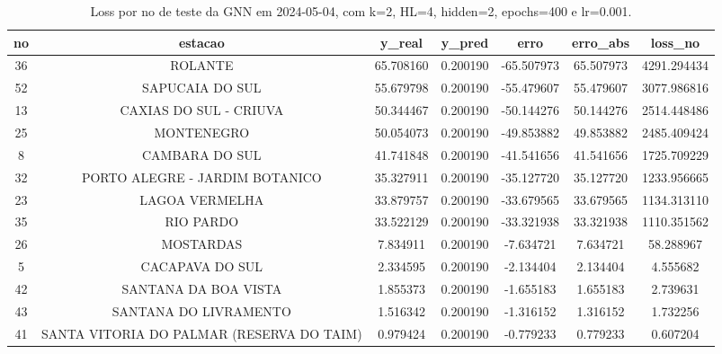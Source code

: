 \begin{table}[h]
\centering
\caption{Loss por no de teste da GNN em 2024-05-04, com k=2, HL=4, hidden=2, epochs=400 e lr=0.001.}
\label{tab:gnn_loss_k2_hl4_h2_e400_d20240504}
\begin{tabular}{ccccccc}
\toprule
no & estacao & y\_real & y\_pred & erro & erro\_abs & loss\_no \\
\midrule
36 & ROLANTE & 65.708160 & 0.200190 & -65.507973 & 65.507973 & 4291.294434 \\
52 & SAPUCAIA DO SUL & 55.679798 & 0.200190 & -55.479607 & 55.479607 & 3077.986816 \\
13 & CAXIAS DO SUL - CRIUVA & 50.344467 & 0.200190 & -50.144276 & 50.144276 & 2514.448486 \\
25 & MONTENEGRO & 50.054073 & 0.200190 & -49.853882 & 49.853882 & 2485.409424 \\
8 & CAMBARA DO SUL & 41.741848 & 0.200190 & -41.541656 & 41.541656 & 1725.709229 \\
32 & PORTO ALEGRE - JARDIM BOTANICO & 35.327911 & 0.200190 & -35.127720 & 35.127720 & 1233.956665 \\
23 & LAGOA VERMELHA & 33.879757 & 0.200190 & -33.679565 & 33.679565 & 1134.313110 \\
35 & RIO PARDO & 33.522129 & 0.200190 & -33.321938 & 33.321938 & 1110.351562 \\
26 & MOSTARDAS & 7.834911 & 0.200190 & -7.634721 & 7.634721 & 58.288967 \\
5 & CACAPAVA DO SUL & 2.334595 & 0.200190 & -2.134404 & 2.134404 & 4.555682 \\
42 & SANTANA DA BOA VISTA & 1.855373 & 0.200190 & -1.655183 & 1.655183 & 2.739631 \\
43 & SANTANA DO LIVRAMENTO & 1.516342 & 0.200190 & -1.316152 & 1.316152 & 1.732256 \\
41 & SANTA VITORIA DO PALMAR (RESERVA DO TAIM) & 0.979424 & 0.200190 & -0.779233 & 0.779233 & 0.607204 \\
\bottomrule
\end{tabular}
\end{table}

